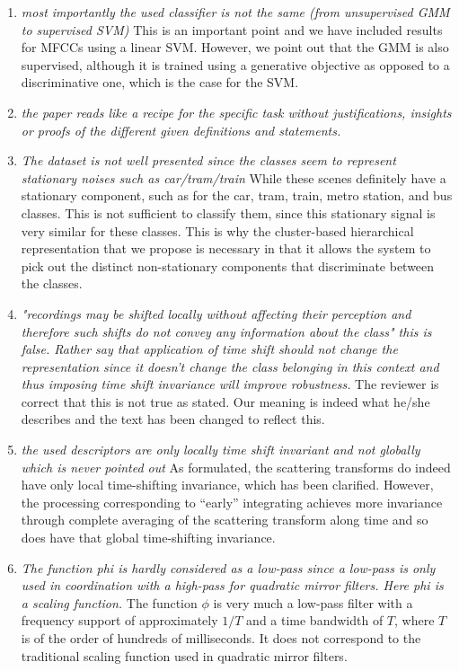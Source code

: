 \documentclass[10pt]{article}
\begin{document}
\begin{enumerate}
\item \emph{most importantly the used classifier is not the same (from unsupervised GMM to supervised SVM)}
This is an important point and we have included results for MFCCs using a linear SVM. However, we point out that the GMM is also supervised, although it is trained using a generative objective as opposed to a discriminative one, which is the case for the SVM.

\item \emph{the paper reads like a recipe for the specific task without justifications, insights or proofs of the different given definitions and statements.}

\item \emph{The dataset is not well presented since the classes seem to represent stationary noises such as car/tram/train}
While these scenes definitely have a stationary component, such as for the car, tram, train, metro station, and bus classes. This is not sufficient to classify them, since this stationary signal is very similar for these classes. This is why the cluster-based hierarchical representation that we propose is necessary in that it allows the system to pick out the distinct non-stationary components that discriminate between the classes.

\item \emph{"recordings may be shifted locally 
without affecting their perception and therefore such shifts do not convey any information about the class" this is false. Rather say that application of time shift should not change the representation since it doesn't change the class belonging in this context and thus imposing time shift invariance will improve robustness.}
The reviewer is correct that this is not true as stated. Our meaning is indeed what he/she describes and the text has been changed to reflect this.

\item \emph{the used descriptors are only locally time shift invariant and not globally which is never pointed out}
As formulated, the scattering transforms do indeed have only local time-shifting invariance, which has been clarified. However, the processing corresponding to ``early'' integrating achieves more invariance through complete averaging of the scattering transform along time and so does have that global time-shifting invariance.

\item \emph{The function phi is hardly considered as a low-pass since a low-pass is only used in coordination with a high-pass for quadratic mirror filters. Here phi is a scaling function.}
The function $\phi$ is very much a low-pass filter with a frequency support of approximately $1/T$ and a time bandwidth of $T$, where $T$ is of the order of hundreds of milliseconds. It does not correspond to the traditional scaling function used in quadratic mirror filters.


\end{enumerate}
\end{document}
